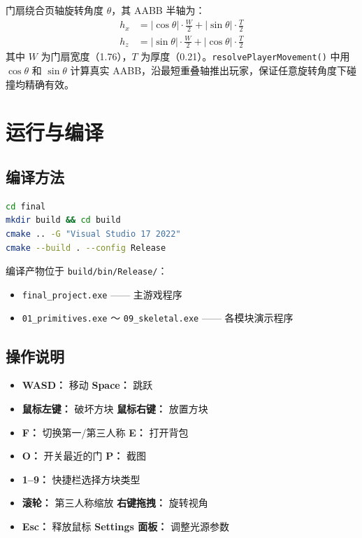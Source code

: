 \documentclass{article}
\begin{document}
门扇绕合页轴旋转角度 $\theta$，其 AABB 半轴为：
\begin{align*}
h_x &= |\cos\theta| \cdot \frac{W}{2} + |\sin\theta| \cdot \frac{T}{2} \\
h_z &= |\sin\theta| \cdot \frac{W}{2} + |\cos\theta| \cdot \frac{T}{2}
\end{align*}
其中 $W$ 为门扇宽度（1.76），$T$ 为厚度（0.21）。\texttt{resolvePlayerMovement()} 中用 $\cos\theta$ 和 $\sin\theta$ 计算真实 AABB，沿最短重叠轴推出玩家，保证任意旋转角度下碰撞均精确有效。

\section{运行与编译}

\subsection{编译方法}
\begin{lstlisting}[language=bash]
cd final
mkdir build && cd build
cmake .. -G "Visual Studio 17 2022"
cmake --build . --config Release
\end{lstlisting}

编译产物位于 \texttt{build/bin/Release/}：
\begin{itemize}[nosep]
    \item \texttt{final\_project.exe} —— 主游戏程序
    \item \texttt{01\_primitives.exe} ～ \texttt{09\_skeletal.exe} —— 各模块演示程序
\end{itemize}

\subsection{操作说明}

\begin{itemize}[nosep]
    \item \textbf{WASD：} 移动 \quad \textbf{Space：} 跳跃
    \item \textbf{鼠标左键：} 破坏方块 \quad \textbf{鼠标右键：} 放置方块
    \item \textbf{F：} 切换第一/第三人称 \quad \textbf{E：} 打开背包
    \item \textbf{O：} 开关最近的门 \quad \textbf{P：} 截图
    \item \textbf{1–9：} 快捷栏选择方块类型
    \item \textbf{滚轮：} 第三人称缩放 \quad \textbf{右键拖拽：} 旋转视角
    \item \textbf{Esc：} 释放鼠标 \quad \textbf{Settings 面板：} 调整光源参数
\end{itemize}
\end{document}
